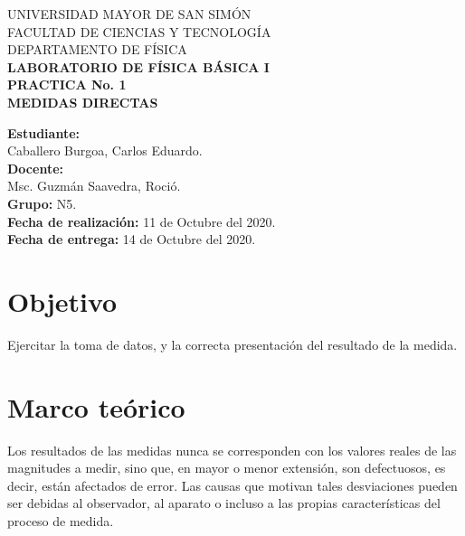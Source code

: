 \documentclass[letter,11pt]{article}
\newcommand{\blankpage}{
    \newpage
    \thispagestyle{empty}
    \mbox{}
    \newpage
}
\begin{document}
\begin{titlepage}
\begin{center}
{\Large UNIVERSIDAD MAYOR DE SAN SIMÓN}\\
\vspace*{0.15cm}
{\large FACULTAD DE CIENCIAS Y TECNOLOGÍA}\\
\vspace*{0.10cm}
DEPARTAMENTO DE FÍSICA\\
\vspace*{3.0cm}
{\Large \textbf{LABORATORIO DE FÍSICA BÁSICA I}}\\
\vspace*{0.3cm}
{\Large \textbf{PRACTICA No. 1}}\\
\vspace*{3.5cm}
{\Large \textbf{MEDIDAS DIRECTAS}}\\
\end{center}

\vspace*{7.4cm}
\leftskip=7.95cm
\noindent
\textbf{Estudiante:}\\
Caballero Burgoa, Carlos Eduardo.\\
\newline
\textbf{Docente:}\\
Msc. Guzmán Saavedra, Roció.\\
\newline
\textbf{Grupo:} N5.\\
\textbf{Fecha de realización:} 11 de Octubre del 2020.\\
\textbf{Fecha de entrega:} 14 de Octubre del 2020.\\

\end{titlepage}

\blankpage

\section{Objetivo}
Ejercitar la toma de datos, y la correcta presentación del resultado de la
medida.

\section{Marco teórico}
Los resultados de las medidas nunca se corresponden con los valores reales de
las magnitudes a medir, sino que, en mayor o menor extensión, son defectuosos,
es decir, están afectados de error. Las causas que motivan tales desviaciones
pueden ser debidas al observador, al aparato o incluso a las propias
características del proceso de medida.
\end{document}
